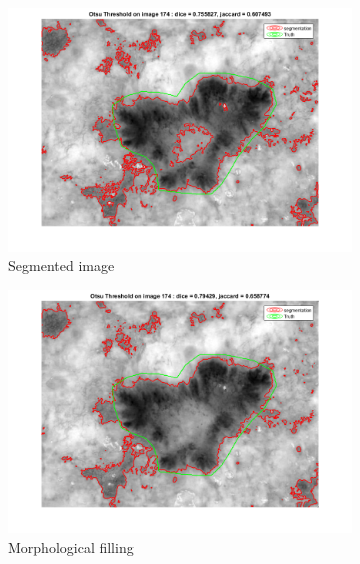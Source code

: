 \documentclass[a4paper,10pt]{article}
\begin{document}
\begin{figure}[h]
	\begin{subfigure}{0.32\linewidth}			
		\includegraphics[width=0.99\linewidth]{../results/postproc/otsu_nopost_174}	
		\caption{Segmented image}
		\label{fig:postproc-orig}
	\end{subfigure}
	\begin{subfigure}{0.32\linewidth}			
		\includegraphics[width=0.99\linewidth]{../results/postproc/otsu_filling_174}	  
		\caption{Morphological filling}
		\label{fig:postproc-fill}
	\end{subfigure}
	\begin{subfigure}{0.32\linewidth}			

\end{subfigure}
\end{figure}
\end{document}
